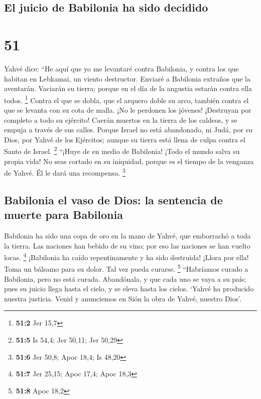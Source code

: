 \hypertarget{el-juicio-de-babilonia-ha-sido-decidido}{%
\subsection{El juicio de Babilonia ha sido
decidido}\label{el-juicio-de-babilonia-ha-sido-decidido}}

\hypertarget{section-50}{%
\section{51}\label{section-50}}

 Yahvé dice: ``He aquí que yo me levantaré contra
Babilonia, y contra los que habitan en Lebkamai, un viento destructor.
 Enviaré a Babilonia extraños que la aventarán. Vaciarán
su tierra; porque en el día de la angustia estarán contra ella todos.
\footnote{\textbf{51:2} Jer 15,7}  Contra el que se dobla,
que el arquero doble su arco, también contra el que se levanta con su
cota de malla. ¡No le perdonen los jóvenes! ¡Destruyan por completo a
todo su ejército!  Caerán muertos en la tierra de los
caldeos, y se empuja a través de sus calles.  Porque
Israel no está abandonado, ni Judá, por su Dios, por Yahvé de los
Ejércitos; aunque su tierra está llena de culpa contra el Santo de
Israel. \footnote{\textbf{51:5} Is 54,4; Jer 50,11; Jer 50,29}
 ``¡Huye de en medio de Babilonia! ¡Todo el mundo salva su
propia vida! No seas cortado en su iniquidad, porque es el tiempo de la
venganza de Yahvé. Él le dará una recompensa. \footnote{\textbf{51:6}
  Jer 50,8; Apoc 18,4; Is 48,20}

\hypertarget{babilonia-el-vaso-de-dios-la-sentencia-de-muerte-para-babilonia}{%
\subsection{Babilonia el vaso de Dios: la sentencia de muerte para
Babilonia}\label{babilonia-el-vaso-de-dios-la-sentencia-de-muerte-para-babilonia}}

 Babilonia ha sido una copa de oro en la mano de Yahvé,
que emborrachó a toda la tierra. Las naciones han bebido de su vino; por
eso las naciones se han vuelto locas. \footnote{\textbf{51:7} Jer 25,15;
  Apoc 17,4; Apoc 18,3}  ¡Babilonia ha caído
repentinamente y ha sido destruida! ¡Llora por ella! Toma un bálsamo
para su dolor. Tal vez pueda curarse. \footnote{\textbf{51:8} Apoc 18,2}
 ``Habríamos curado a Babilonia, pero no está curada.
Abandónala, y que cada uno se vaya a su país; pues su juicio llega hasta
el cielo, y se eleva hasta los cielos.  `Yahvé ha
producido nuestra justicia. Venid y anunciemos en Sión la obra de Yahvé,
nuestro Dios'.

